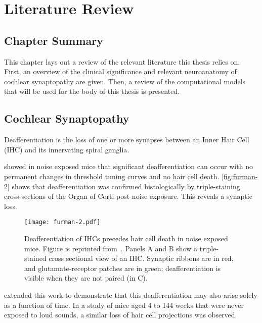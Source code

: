 \chapter{Literature Review}
\label{chapter:literaturereview}
\thispagestyle{myheadings}
\graphicspath{{2_LiteratureReview/Figures/}}
\section{Chapter Summary} %
\label{sec:review_summary}
This chapter lays out a review of the relevant literature this thesis relies on. First, an overview of the clinical significance and relevant neuroanatomy of cochlear synaptopathy are given.  Then, a review of the computational models that will be used for the body of this thesis is presented. 

\section{Cochlear Synaptopathy} %
\label{sec:cochlear_synaptopathy}
Deafferentiation is the loss of one or more synapses between an Inner Hair Cell (IHC) and its innervating spiral ganglia. 

\cite{Kujawa2009Adding} showed in noise exposed mice that significant deafferentiation can occur with no permanent changes in threshold tuning curves and no hair cell death. \autoref{fig:furman-2} shows that deafferentiation was confirmed histologically by triple-staining cross-sections of the Organ of Corti post noise exposure.  This reveals a synaptic loss. 

\begin{figure}[htbp]
	\centering
	\texttt{[image: furman-2.pdf]}
	\caption[Deafferentation of Inner Hair Cells]{Deafferentiation of IHCs precedes hair cell death in noise exposed mice.  Figure is reprinted from~\cite{Furman2013NoiseInduced}.  Panels A  and B show a triple-stained cross sectional view of an IHC.  Synaptic ribbons are in red, and glutamate-receptor patches are in green; deafferentiation is visible when they are not paired (in C).  }
	\label{fig:furman-2}
\end{figure}


\cite{Sergeyenko2013AgeRelated} extended this work to demonstrate that this deafferentiation may also arise solely as a function of time.  In a study of mice aged 4 to 144 weeks that were never exposed to loud sounds, a similar loss of hair cell projections was observed.


